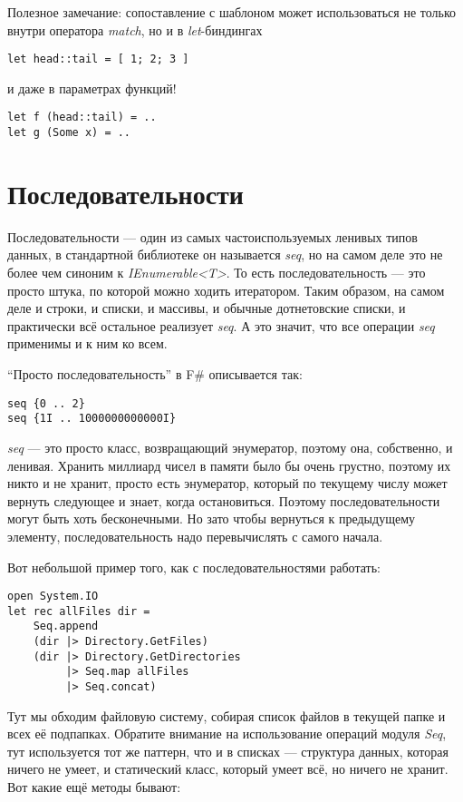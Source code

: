 \documentclass[a5paper]{article}
\begin{document}
Полезное замечание: сопоставление с шаблоном может использоваться не только внутри оператора \textit{match}, но и в \textit{let}-биндингах
\begin{verbatim}
let head::tail = [ 1; 2; 3 ]
\end{verbatim}
и даже в параметрах функций!  
\begin{verbatim}
let f (head::tail) = ..
let g (Some x) = ..
\end{verbatim}

\section{Последовательности}

Последовательности --- один из самых частоиспользуемых ленивых типов данных, в стандартной библиотеке он называется \textit{seq}, но на самом деле это не более чем синоним к \textit{IEnumerable<T>}. То есть последовательность --- это просто штука, по которой можно ходить итератором. Таким образом, на самом деле и строки, и списки, и массивы, и обычные дотнетовские списки, и практически всё остальное реализует \textit{seq}. А это значит, что все операции \textit{seq} применимы и к ним ко всем.

``Просто последовательность'' в F\# описывается так:

\begin{verbatim}
seq {0 .. 2}
seq {1I .. 1000000000000I}
\end{verbatim}

\textit{seq} --- это просто класс, возвращающий энумератор, поэтому она, собственно, и ленивая. Хранить миллиард чисел в памяти было бы очень грустно, поэтому их никто и не хранит, просто есть энумератор, который по текущему числу может вернуть следующее и знает, когда остановиться. Поэтому последовательности могут быть хоть бесконечными. Но зато чтобы вернуться к предыдущему элементу, последовательность надо перевычислять с самого начала.

Вот небольшой пример того, как с последовательностями работать:

\begin{verbatim}
open System.IO
let rec allFiles dir =
    Seq.append
    (dir |> Directory.GetFiles)
    (dir |> Directory.GetDirectories 
         |> Seq.map allFiles 
         |> Seq.concat)
\end{verbatim}

Тут мы обходим файловую систему, собирая список файлов в текущей папке и всех её подпапках. Обратите внимание на использование операций модуля \textit{Seq}, тут используется тот же паттерн, что и в списках --- структура данных, которая ничего не умеет, и статический класс, который умеет всё, но ничего не хранит. Вот какие ещё методы бывают:
\end{document}
